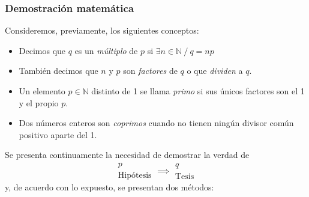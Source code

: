 \subsubsection{Demostración matemática}

Consideremos, previamente, los siguientes conceptos:
\begin{itemize}
	\item Decimos que $q$ es un \textit{múltiplo} de $p$ si $\exists n \in \mathbb{N} \ / \ q = np$
	\item También decimos que $n$ y $p$ son \textit{factores} de $q$ o que \textit{dividen} a $q$.
	\item Un elemento $p\in \mathbb{N}$ distinto de 1 se llama \textit{primo} si sus únicos factores son el 1 y el propio $p$.
	\item Dos números enteros son \textit{coprimos} cuando no tienen ningún divisor común positivo aparte del 1.
\end{itemize}


Se presenta continuamente la necesidad de demostrar la verdad de
\[ \begin{array}{c}
	p\\
	\mbox{Hipótesis}
\end{array} \implies \begin{array}{c}
q\\
\mbox{Tesis}
\end{array} \]
y, de acuerdo con lo expuesto, se presentan dos métodos:

